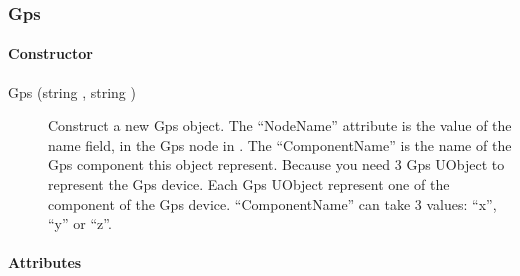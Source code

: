 \subsubsection{Gps}

\paragraph{Constructor}

\noindent
\begin{description}
\item[{Gps (string , string )}]
  Construct a new Gps object.  The ``NodeName'' attribute is the value
  of the name field, in the Gps node in \webots.  The ``ComponentName''
  is the name of the Gps component this object represent.  Because you
  need 3 Gps UObject to represent the \webots Gps device. Each Gps
  UObject represent one of the component of the \webots Gps device.
  ``ComponentName'' can take 3 values: ``x'', ``y'' or ``z''.
\end{description}

\paragraph{Attributes}


